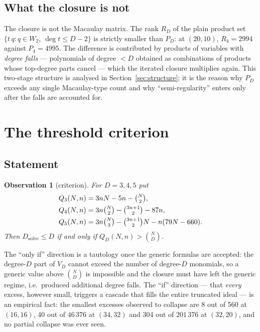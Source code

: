 \documentclass[11pt,a4paper]{article}
\newtheorem{observation}{Observation}
\theoremstyle{remark}\newtheorem{remark}{Remark}
\newcommand{\Dsolve}{D_{\mathrm{solve}}}
\begin{document}
\subsection{What the closure is not}

The closure is not the Macaulay matrix. The rank $R_D$ of the plain product set $\{t\,q: q\in W_2,\ \deg t\le D-2\}$ is strictly smaller than $P_D$: at $(20,10)$, $R_4=2994$ against $P_4=4995$. The difference is contributed by products of variables with \emph{degree falls} --- polynomials of degree $<D$ obtained as combinations of products whose top-degree parts cancel --- which the iterated closure multiplies again. This two-stage structure is analysed in Section~\ref{sec:structure}; it is the reason why $P_D$ exceeds any single Macaulay-type count and why ``semi-regularity'' enters only after the falls are accounted for.

\section{The threshold criterion}\label{sec:criterion}

\subsection{Statement}

\begin{observation}[criterion]\label{obs:criterion}
For $D=3,4,5$ put
\begin{align*}
Q_3(N,n)&=3nN-5n-\tbinom N2,\\
Q_4(N,n)&=3n\tbinom N2-\tbinom{3n+1}2-87n,\\
Q_5(N,n)&=3n\tbinom N3-\tbinom{3n+1}2N-n(79N-660).
\end{align*}
Then $\Dsolve\le D$ if and only if $Q_D(N,n)>\binom ND$.
\end{observation}

The ``only if'' direction is a tautology once the generic formulas are accepted: the degree-$D$ part of $V_D$ cannot exceed the number of degree-$D$ monomials, so a generic value above $\binom ND$ is impossible and the closure must have left the generic regime, i.e.\ produced additional degree falls. The ``if'' direction --- that \emph{every} excess, however small, triggers a cascade that fills the entire truncated ideal --- is an empirical fact: the smallest excesses observed to collapse are 8 out of 560 at $(16,16)$, 40 out of $46\,376$ at $(34,32)$ and 304 out of $201\,376$ at $(32,20)$, and no partial collapse was ever seen.
\end{document}
